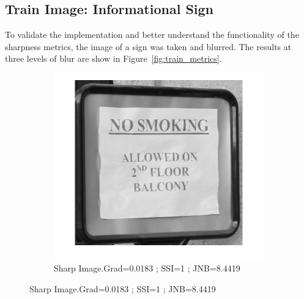 \subsection{Train Image: Informational Sign}
To validate the implementation and better understand the functionality of the sharpness metrics, the image of a sign was taken and blurred. The results at three levels of blur are show in Figure~\ref{fig:train_metrics}.

\begin{figure}[h!]
        \centering
        \begin{subfigure}[b]{0.3\textwidth}
                \centering
                \includegraphics[width=\textwidth]{true.jpg}
                \caption{Sharp Image.\newline Grad=0.0183 ; SSI=1 ; JNB=8.4419}
               

\end{subfigure}
\end{figure}
